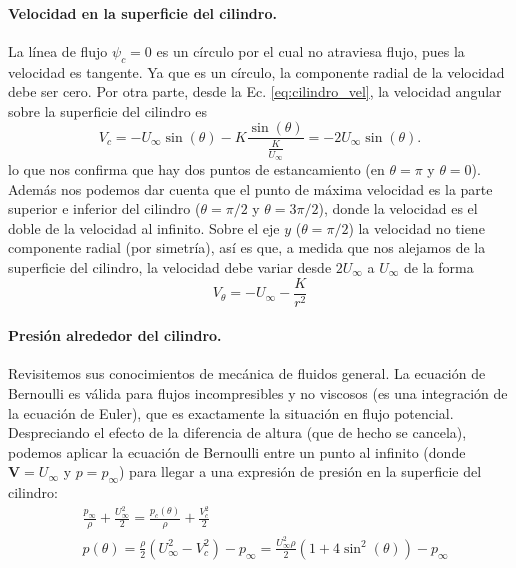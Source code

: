\paragraph{Velocidad en la superficie del cilindro.}
La línea de flujo $\psi_c=0$ es un círculo por el cual no atraviesa flujo, pues la velocidad es tangente.
Ya que es un círculo, la componente radial de la velocidad debe ser cero.
Por otra parte, desde la Ec. \eqref{eq:cilindro_vel}, la velocidad angular sobre la superficie del cilindro es
%
\begin{equation}
V_c = -U_\infty\sin(\theta) - K\frac{\sin(\theta)}{\frac{K}{U_\infty}} = -2U_\infty\sin(\theta).
\end{equation}
%
lo que nos confirma que hay dos puntos de estancamiento (en $\theta=\pi$ y $\theta=0$).
Además nos podemos dar cuenta que el punto de máxima velocidad es la parte superior e inferior del cilindro ($\theta=\pi/2$ y $\theta=3\pi/2$), donde la velocidad es el doble de la velocidad al infinito.
Sobre el eje $y$ ($\theta=\pi/2$) la velocidad no tiene componente radial (por simetría), así es que, a medida que nos alejamos de la superficie del cilindro, la velocidad debe variar desde $2U_\infty$ a $U_\infty$ de la forma
%
\begin{equation}
V_\theta = -U_\infty - \frac{K}{r^2}
\end{equation}

\paragraph{Presión alrededor del cilindro.}

Revisitemos sus conocimientos de mecánica de fluidos general.
La ecuación de Bernoulli es válida para flujos incompresibles y no viscosos (es una integración de la ecuación de Euler), que es exactamente la situación en flujo potencial.
Despreciando el efecto de la diferencia de altura (que de hecho se cancela), podemos aplicar la ecuación de Bernoulli entre un punto al infinito (donde $\mathbf{V}=U_\infty$ y $p=p_\infty$) para llegar a una expresión de presión en la superficie del cilindro:
%
\begin{align}\label{eq:cilindro_p}
&\frac{p_\infty}{\rho} + \frac{U_\infty^2}{2} = \frac{p_c(\theta)}{\rho} + \frac{V_c^2}{2}\nonumber\\
&p(\theta) = \frac{\rho}{2}\left(U_\infty^2-V_c^2\right) - p_\infty = \frac{U_\infty^2\rho}{2}\left(1+4\sin^2(\theta)\right) - p_\infty
\end{align}

